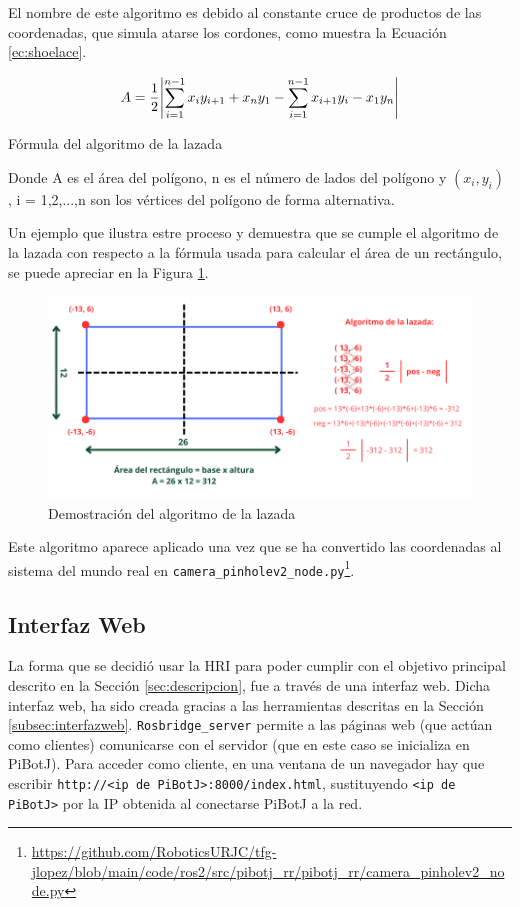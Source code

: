 El nombre de este algoritmo es debido al constante cruce de productos de las coordenadas, que simula atarse los cordones, como muestra la Ecuación \ref{ec:shoelace}.
\begin{myequation}[h]
	\begin{equation}
		A = \frac{1}{2}\abs{\sum_{i=1}^{n-1}x_i y_{i+1} + x_n y_1 - \sum_{i=1}^{n-1}x_{i+1} y_{i} - x_1 y_n}
		\nonumber
	\end{equation}
	\caption[Fórmula del algoritmo de la lazada]{Fórmula del algoritmo de la lazada}
	\label{ec:shoelace}
\end{myequation} 

Donde A es el área del polígono, n es el número de lados del polígono y $(x_i, y_i)$ , i = 1,2,...,n son los vértices del polígono de forma alternativa.

Un ejemplo que ilustra estre proceso y demuestra que se cumple el algoritmo de la lazada con respecto a la fórmula usada para calcular el área de un rectángulo, se puede apreciar en la Figura \ref{fig:demoshoelace}.

 \begin{figure} [h!]
	\begin{center}
		\includegraphics[width=15cm]{figs/cap6/demoshoelace.png}
	\end{center}
	\caption{Demostración del algoritmo de la lazada}
	\label{fig:demoshoelace}
\end{figure}


Este algoritmo aparece aplicado una vez que se ha convertido las coordenadas al sistema del mundo real en \verb|camera_pinholev2_node.py|\footnote{\url{https://github.com/RoboticsURJC/tfg-jlopez/blob/main/code/ros2/src/pibotj_rr/pibotj_rr/camera_pinholev2_node.py}}.


\subsection{Interfaz Web}
\label{subsec:softwareweb}
La forma que se decidió usar la \ac{HRI} para poder cumplir con el objetivo principal descrito en la Sección \ref{sec:descripcion}, fue a través de una interfaz web. Dicha interfaz web, ha sido creada gracias a las herramientas descritas en la Sección \ref{subsec:interfazweb}. \verb|Rosbridge_server| permite a las páginas web (que actúan como clientes) comunicarse con el servidor (que en este caso se inicializa en PiBotJ). Para acceder como cliente, en una ventana de un navegador hay que escribir \verb|http://<ip de PiBotJ>:8000/index.html|, sustituyendo \verb|<ip de PiBotJ>| por la IP obtenida al conectarse PiBotJ a la red.
 
